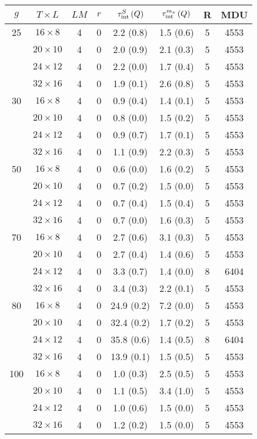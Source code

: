\begin{longtable}{cccccccc}
\toprule
$g$ & $T\times L$ & $LM$ & $r$ & $\tau_{\rm int}^{S}\,(Q)$ & $\tau_{\rm int}^{m_x}\,(Q)$ & R & MDU \\
\midrule
 25 & $16 \times   8$ &  4 & 0 & 2.2 \; (0.8) & 1.5 \; (0.6) & 5 & 4553 \\
    & $20 \times  10$ &  4 & 0 & 2.0 \; (0.9) & 2.1 \; (0.3) & 5 & 4553 \\
    & $24 \times  12$ &  4 & 0 & 2.2 \; (0.0) & 1.7 \; (0.4) & 5 & 4553 \\
    & $32 \times  16$ &  4 & 0 & 1.9 \; (0.1) & 2.6 \; (0.8) & 5 & 4553 \\
\midrule
 30 & $16 \times   8$ &  4 & 0 & 0.9 \; (0.4) & 1.4 \; (0.1) & 5 & 4553 \\
    & $20 \times  10$ &  4 & 0 & 0.8 \; (0.0) & 1.5 \; (0.2) & 5 & 4553 \\
    & $24 \times  12$ &  4 & 0 & 0.9 \; (0.7) & 1.7 \; (0.1) & 5 & 4553 \\
    & $32 \times  16$ &  4 & 0 & 1.1 \; (0.9) & 2.2 \; (0.3) & 5 & 4553 \\
\midrule
 50 & $16 \times   8$ &  4 & 0 & 0.6 \; (0.0) & 1.6 \; (0.2) & 5 & 4553 \\
    & $20 \times  10$ &  4 & 0 & 0.7 \; (0.2) & 1.5 \; (0.0) & 5 & 4553 \\
    & $24 \times  12$ &  4 & 0 & 0.7 \; (0.4) & 1.5 \; (0.4) & 5 & 4553 \\
    & $32 \times  16$ &  4 & 0 & 0.7 \; (0.0) & 1.6 \; (0.3) & 5 & 4553 \\
\midrule
 70 & $16 \times   8$ &  4 & 0 & 2.7 \; (0.6) & 3.1 \; (0.3) & 5 & 4553 \\
    & $20 \times  10$ &  4 & 0 & 2.7 \; (0.4) & 1.4 \; (0.6) & 5 & 4553 \\
    & $24 \times  12$ &  4 & 0 & 3.3 \; (0.7) & 1.4 \; (0.0) & 8 & 6404 \\
    & $32 \times  16$ &  4 & 0 & 3.4 \; (0.3) & 2.2 \; (0.1) & 5 & 4553 \\
\midrule
 80 & $16 \times   8$ &  4 & 0 & 24.9 \; (0.2) & 7.2 \; (0.0) & 5 & 4553 \\
    & $20 \times  10$ &  4 & 0 & 32.4 \; (0.2) & 1.7 \; (0.2) & 5 & 4553 \\
    & $24 \times  12$ &  4 & 0 & 35.8 \; (0.6) & 1.4 \; (0.5) & 8 & 6404 \\
    & $32 \times  16$ &  4 & 0 & 13.9 \; (0.1) & 1.5 \; (0.5) & 5 & 4553 \\
\midrule
100 & $16 \times   8$ &  4 & 0 & 1.0 \; (0.3) & 2.5 \; (0.5) & 5 & 4553 \\
    & $20 \times  10$ &  4 & 0 & 1.1 \; (0.5) & 3.4 \; (1.0) & 5 & 4553 \\
    & $24 \times  12$ &  4 & 0 & 1.0 \; (0.6) & 1.5 \; (0.0) & 5 & 4553 \\
    & $32 \times  16$ &  4 & 0 & 1.2 \; (0.2) & 1.5 \; (0.0) & 5 & 4553 \\
\bottomrule
\end{longtable}
